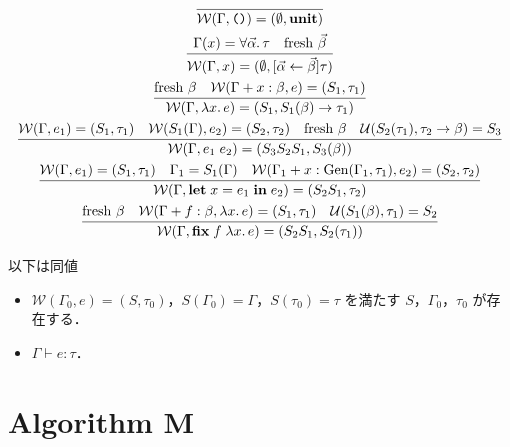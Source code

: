 \begin{gather*}
  \infer{\mathcal{W}(\Gamma, \text{\texttt{()}}) = (\emptyset, \mathbf{unit})}{}
  \\
  \infer{\mathcal{W}(\Gamma, x) = (\emptyset, [\vec{\alpha} \assign \vec{\beta}]\tau)}{
    \Gamma(x) = \forall\vec{\alpha}\ldotp \tau
    &
    \text{fresh $\vec{\beta}$}
  }
  \\
  \infer{\mathcal{W}(\Gamma, \lambda x\ldotp e) = (S_1, S_1(\beta) \to \tau_1)}{
    \text{fresh $\beta$}
    &
    \mathcal{W}(\Gamma + x:\beta, e) = (S_1, \tau_1)
  }
  \\
  \infer{\mathcal{W}(\Gamma, e_1\; e_2) = (S_3S_2S_1, S_3(\beta))}{
    \mathcal{W}(\Gamma, e_1) = (S_1, \tau_1)
    &
    \mathcal{W}(S_1(\Gamma), e_2) = (S_2, \tau_2)
    &
    \text{fresh $\beta$}
    &
    \mathcal{U}(S_2(\tau_1), \tau_2 \to \beta) = S_3
  }
  \\
  \infer{\mathcal{W}(\Gamma, \mathbf{let}\;x = e_1\;\mathbf{in}\;e_2) = (S_2S_1, \tau_2)}{
    \mathcal{W}(\Gamma, e_1) = (S_1, \tau_1)
    &
    \Gamma_1 = S_1(\Gamma)
    &
    \mathcal{W}(\Gamma_1 + x:\mathrm{Gen}(\Gamma_1, \tau_1), e_2) = (S_2, \tau_2)
  }
  \\
  \infer{\mathcal{W}(\Gamma, \mathbf{fix}\;f\;\lambda x\ldotp e) = (S_2S_1, S_2(\tau_1))}{
    \text{fresh $\beta$}
    &
    \mathcal{W}(\Gamma + f:\beta, \lambda x\ldotp e) = (S_1, \tau_1)
    &
    \mathcal{U}(S_1(\beta), \tau_1) = S_2
  }
\end{gather*}

\begin{theorem}
  以下は同値
  \begin{itemize}
    \item $\mathcal{W}(\Gamma_0, e) = (S, \tau_0)$，$S(\Gamma_0) = \Gamma$，$S(\tau_0) = \tau$ を満たす $S$，$\Gamma_0$，$\tau_0$ が存在する．
    \item $\Gamma \vdash e: \tau$．
  \end{itemize}
\end{theorem}

\section{Algorithm M}

